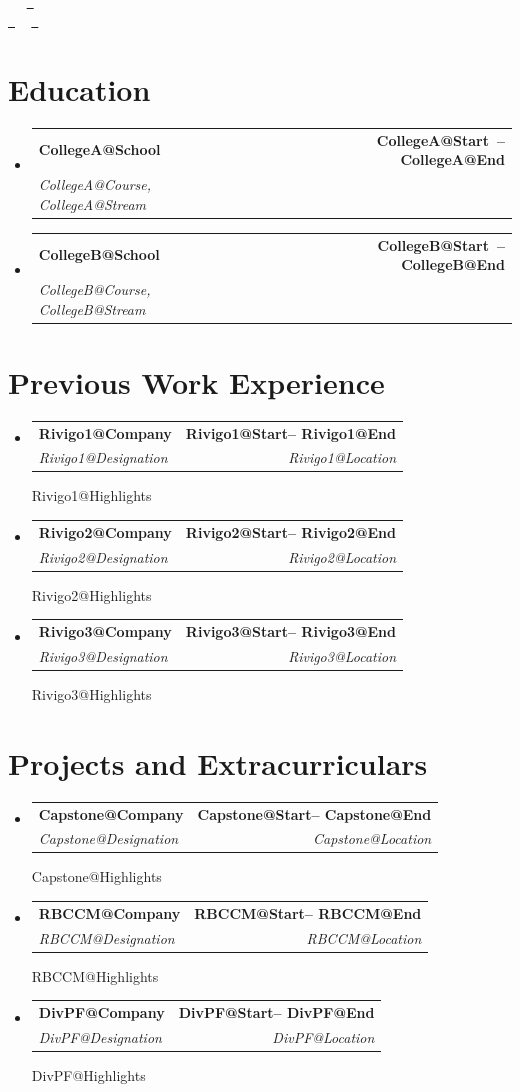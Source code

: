 \documentclass[letterpaper,11pt]{article}
\makeatletter
\newcommand{\describe}[2]{
    \csname #1@#2\endcsname
}
\newcommand{\resumeSubheading}[4]{
  \vspace{-2pt}\item
    \begin{tabular*}{1.0\textwidth}[t]{l@{\extracolsep{\fill}}r}
      \textbf{#1} & \textbf{\footnotesize #2} \\
      \textit{\footnotesize#3} & \textit{\footnotesize #4} \\
    \end{tabular*}\vspace{-7pt}
}
\newcommand{\resumeProjectHeading}[2]{
    \item
    \begin{tabular*}{1.001\textwidth}{l@{\extracolsep{\fill}}r}
      \footnotesize#1 & \textbf{\footnotesize #2}\\
    \end{tabular*}\vspace{-7pt}
}
\newcommand{\resumeSubHeadingListStart}{\begin{itemize}[leftmargin=0.0in, label={}]}
\newcommand{\resumeSubHeadingListEnd}{\end{itemize}}
\def\titlesection{
\begin{center}
    {\Huge \scshape \firstname \ \lastname} \\ \vspace{1pt}
    \footnotesize \raisebox{-0.1\height}\faPhone\ \jasphone ~ \href{mailto:artessman03@gmail.com}{\raisebox{-0.2\height}\faEnvelope\  \underline{\email}} \\
    \href{https://www.linkedin.com/in/aden-tessman-3b7203336/}{\raisebox{-0.2\height}\faLinkedin\ \underline{\linkedin}}  ~
    \href{https://github.com/artessman}{\raisebox{-0.2\height}\faGithub\ \underline{\github}}
    \vspace{-8pt}
\end{center}
}
\makeatother
\begin{document}
\titlesection
\profileSummary
\vspace{-10pt}


\section{Education}
  \resumeSubHeadingListStart
    \resumeSubheading{\csname CollegeA@School\endcsname}
    {\csname CollegeA@Start\endcsname \ -- \csname CollegeA@End\endcsname}
    {\csname CollegeA@Course\endcsname, \csname CollegeA@Stream\endcsname}{}

    \resumeSubheading{\csname CollegeB@School\endcsname}
    {\csname CollegeB@Start\endcsname \ -- \csname CollegeB@End\endcsname}
    {\csname CollegeB@Course\endcsname, \csname CollegeB@Stream\endcsname}{}
\resumeSubHeadingListEnd


\achievements
\newcommand{\renderExp}[1]{
\resumeSubheading
      {\csname #1@Company\endcsname}{\csname #1@Start\endcsname -- \csname #1@End\endcsname}
      {\csname #1@Designation\endcsname}{\csname #1@Location\endcsname}
      \csname #1@Highlights\endcsname
}
\section{Previous Work Experience}
\resumeSubHeadingListStart
    \renderExp{Rivigo1}
\resumeSubHeadingListEnd
\resumeSubHeadingListStart
    \renderExp{Rivigo2}
\resumeSubHeadingListEnd
\resumeSubHeadingListStart
    \renderExp{Rivigo3}
\resumeSubHeadingListEnd
\section{Projects and Extracurriculars}
    \resumeSubHeadingListStart
        \renderExp{Capstone}
        \renderExp{RBCCM}
        \renderExp{DivPF}
  \resumeSubHeadingListEnd



\newcommand{\renderHck}[1]{
      \resumeProjectHeading
      {\textbf{\csname #1@Title\endcsname} $|$ \csname #1@Position\endcsname}
      {\csname #1@Date\endcsname}
      \csname #1@Highlights\endcsname
}


\renewcommand{\renderHck}[1]{
      \resumeProjectHeading
      {\textbf{\csname #1@Title\endcsname} $|$ \csname #1@Position\endcsname}
      {\csname #1@Date\endcsname}
      \csname #1@Highlights\endcsname
}
\end{document}
